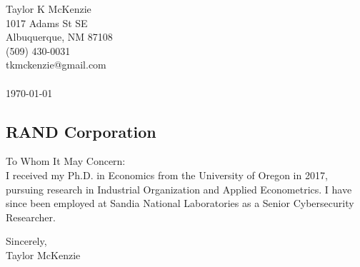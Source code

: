 \documentclass[]{article}
\begin{document}
\thispagestyle{empty}

\noindent Taylor K McKenzie\\1017 Adams St SE\\ Albuquerque, NM 87108\\ (509) 430-0031\\ tkmckenzie@gmail.com\\ \\
\today

\subsection*{RAND Corporation}

To Whom It May Concern: \\

I received my Ph.D. in Economics from the University of Oregon in 2017, pursuing research in Industrial Organization and Applied Econometrics. I have since been employed at Sandia National Laboratories as a Senior Cybersecurity Researcher. 

\noindent Sincerely,\\

\noindent Taylor McKenzie
\end{document}

